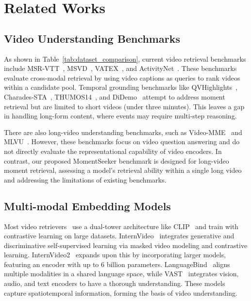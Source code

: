 \section{Related Works}
\subsection{Video Understanding Benchmarks}
As shown in Table~\ref{tab:dataset_comparison}, current video retrieval benchmarks include MSR-VTT~\cite{msrvtt}, MSVD~\cite{msvd}, VATEX~\cite{vatex}, and ActivityNet~\cite{2015ActivityNet}. These benchmarks evaluate cross-modal retrieval by using video captions as queries to rank videos within a candidate pool. Temporal grounding benchmarks like QVHighlights~\cite{qvhighlights}, Charades-STA~\cite{gao2017charadeSTA}, THUMOS14~\cite{THUMOS14}, and DiDemo~\cite{hendricks2017didemo} attempt to address moment retrieval but are limited to short videos (under three minutes). This leaves a gap in handling long-form content, where events may  require multi-step reasoning. 

There are also long-video understanding benchmarks, such as Video-MME~\cite{fu2024videomme} and MLVU~\cite{zhou2025mlvu}. However, these benchmarks focus on video question answering and do not directly evaluate the representational capability of video encoders. In contrast, our proposed MomentSeeker benchmark is designed for long-video moment retrieval, assessing a model's retrieval ability within a single long video and addressing the limitations of existing benchmarks.

\subsection{Multi-modal Embedding Models}

Most video retrievers~\cite{li2022uniformer,wang2022internvideo,zhu2023languagebind} use a dual-tower architecture like CLIP~\cite{radford2021clip} and train with contrastive learning on large datasets. InternVideo~\cite{wang2022InterVideo} integrates generative and discriminative self-supervised learning via masked video modeling and contrastive learning. InternVideo2~\cite{wang2025internvideo2} expands upon this by incorporating larger models, featuring an encoder with up to 6 billion parameters. LanguageBind~\cite{zhu2023languagebind} aligns multiple modalities in a shared language space, while VAST~\cite{chen2023vast} integrates vision, audio, and text encoders to have a thorough understanding. These models capture spatiotemporal information, forming the basis of video understanding.


